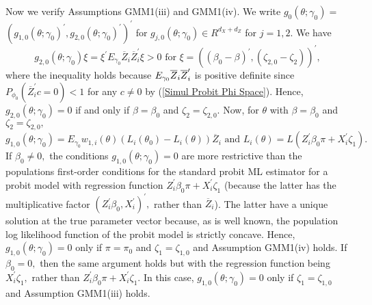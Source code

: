 \documentclass[12pt,thmsb,titlepage,final,oneside,letterpaper]{article}
\begin{document}
Now we verify Assumptions GMM1(iii) and GMM1(iv). We write $g_{0}(\theta
;\gamma _{0})=$\linebreak $(g_{1,0}(\theta ;\gamma _{0})^{\prime
},g_{2,0}(\theta ;\gamma _{0})^{\prime })^{\prime }$ for $g_{j,0}(\theta
;\gamma _{0})\in R^{d_{X}+d_{Z}}$ for $j=1,2.$ We have 
\begin{equation*}
g_{2,0}(\theta ;\gamma _{0})\xi =\xi ^{\prime }E_{\gamma _{0}}\overline{Z}%
_{i}\overline{Z}_{i}^{\prime }\xi >0\text{ for }\xi =((\beta _{0}-\beta
)^{\prime },(\zeta _{2,0}-\zeta _{2}))^{\prime },
\end{equation*}%
where the inequality holds because $E_{\gamma _{0}}\overline{Z}_{i}\overline{%
Z}_{i}^{\prime }$ is positive definite since $P_{\phi _{0}}(\overline{Z}%
_{i}^{\prime }c=0)<1$ for any $c\neq 0$ by (\ref{Simul Probit Phi Space}).
Hence, $g_{2,0}(\theta ;\gamma _{0})=0$ if and only if $\beta =\beta _{0}$
and $\zeta _{2}=\zeta _{2,0}.$ Now, for $\theta $ with $\beta =\beta _{0}$
and $\zeta _{2}=\zeta _{2,0},$ 
\begin{equation}
g_{1,0}(\theta ;\gamma _{0})=E_{\gamma _{0}}w_{1,i}(\theta )(L_{i}(\theta
_{0})-L_{i}(\theta ))\overline{Z}_{i}\text{ and }L_{i}(\theta
)=L(Z_{i}^{\prime }\beta _{0}\pi +X_{i}^{\prime }\zeta _{1}).
\end{equation}%
If $\beta _{0}\neq 0,$ the conditions $g_{1,0}(\theta ;\gamma _{0})=0$ are
more restrictive than the populations first-order conditions for the
standard probit ML estimator for a probit model with regression function $%
Z_{i}^{\prime }\beta _{0}\pi +X_{i}^{\prime }\zeta _{1}$ (because the latter
has the multiplicative factor $(Z_{i}^{\prime }\beta _{0},X_{i}^{\prime
})^{\prime },$ rather than $\overline{Z}_{i}$). The latter have a unique
solution at the true parameter vector because, as is well known, the
population log likelihood function of the probit model is strictly concave.
Hence, $g_{1,0}(\theta ;\gamma _{0})=0$ only if $\pi =\pi _{0}$ and $\zeta
_{1}=\zeta _{1,0}$ and Assumption GMM1(iv) holds. If $\beta _{0}=0,$ then
the same argument holds but with the regression function being $%
X_{i}^{\prime }\zeta _{1},$ rather than $Z_{i}^{\prime }\beta _{0}\pi
+X_{i}^{\prime }\zeta _{1}.$ In this case, $g_{1,0}(\theta ;\gamma _{0})=0$
only if $\zeta _{1}=\zeta _{1,0}$ and Assumption GMM1(iii) holds.
\end{document}
